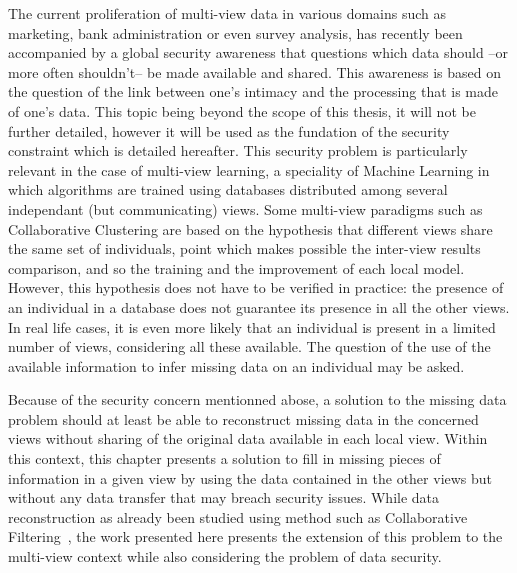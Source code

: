 The current proliferation of multi-view data in various domains such as marketing, bank administration or even survey analysis, has recently been accompanied by a global security awareness that questions which data should --or more often shouldn't-- be made available and shared. This awareness is based on the question of the link between one's intimacy and the processing that is made of one's data. This topic being beyond the scope of this thesis, it will not be further detailed, however it will be used as the fundation of the security constraint which is detailed hereafter. This security problem is particularly relevant in the case of multi-view learning, a speciality of Machine Learning in which algorithms are trained using databases distributed among several independant (but communicating) views. Some multi-view paradigms such as Collaborative Clustering are based on the hypothesis that different views share the same set of individuals, point which makes possible the inter-view results comparison, and so the training and the improvement of each local model. However, this hypothesis does not have to be verified in practice: the presence of an individual in a database does not guarantee its presence in all the other views. In real life cases, it is even more likely that an individual is present in a limited number of views, considering all these available. The question of the use of the available information to infer missing data on an individual may be asked.
	
Because of the security concern mentionned abose, a solution to the missing data problem should at least be able to reconstruct missing data in the concerned views without sharing of the original data available in each local view.	Within this context, this chapter presents a solution to fill in missing pieces of information in a given view by using the data contained in the other views but without any data transfer that may breach security issues. While data reconstruction as already been studied using method such as Collaborative Filtering~\cite{koren2015advances}, the work presented here presents the extension of this problem to the multi-view context while also considering the problem of data security.

